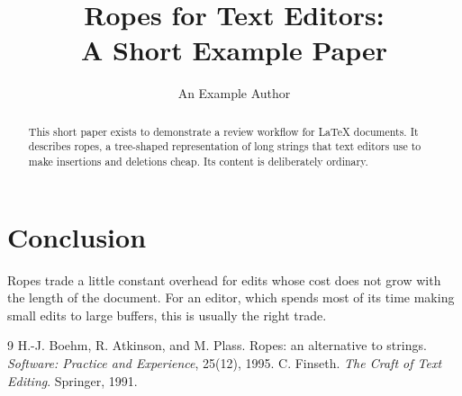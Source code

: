 \documentclass[11pt]{article}
\title{Ropes for Text Editors:\\ A Short Example Paper}
\author{An Example Author}
\date{}
\begin{document}
\maketitle

\begin{abstract}
This short paper exists to demonstrate a review workflow for LaTeX documents.
It describes ropes, a tree-shaped representation of long strings that text
editors use to make insertions and deletions cheap. Its content is
deliberately ordinary.
\end{abstract}





\section{Conclusion}
\label{sec:conclusion}
Ropes trade a little constant overhead for edits whose cost does not grow
with the length of the document. For an editor, which spends most of its
time making small edits to large buffers, this is usually the right trade.

\begin{thebibliography}{9}
 H.-J. Boehm, R. Atkinson, and M. Plass.
  Ropes: an alternative to strings.
  \emph{Software: Practice and Experience}, 25(12), 1995.
 C. Finseth. \emph{The Craft of Text Editing}. Springer, 1991.
\end{thebibliography}
\end{document}
